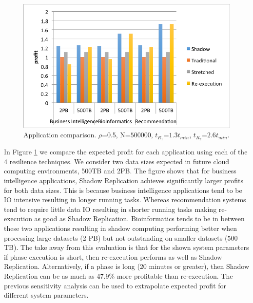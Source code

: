 \begin{figure}[!h]
	
	\begin{center}
	\includegraphics[width=\columnwidth]{diagrams/application_comparison.png}
	\end{center}
	\caption{Application comparison. $\rho$=0.5, N=$500000$, $t_{R_1}$=$1.3t_{min}$, $t_{R_2}$=$2.6t_{min}$.}
	\label{fig:app_compare}
\end{figure}


In Figure \ref{fig:app_compare} we compare the expected
profit for each application using each of the 4 resilience techniques. 
We consider two data sizes expected in future
cloud computing environments, 500TB and 2PB. The figure shows that
for business intelligence applications, Shadow Replication achieves significantly larger profits for both data sizes. This
is because business intelligence applications tend to be IO intensive
resulting in longer running tasks. Whereas recommendation systems tend
to require little data IO resulting in shorter running tasks making
re-execution as good as Shadow Replication. Bioinformatics tends to be in between
these two applications resulting in shadow computing performing better
when processing large datasets (2 PB) but not outstanding on smaller
datasets (500 TB). The take away from this evaluation is that for the
shown system parameters if phase execution is short, then re-execution
performs as well as Shadow Replication. Alternatively, if a phase is long (20 minutes or
greater), then Shadow Replication can be as much as 47.9\% more
profitable than re-execution. The previous sensitivity analysis can be
used to extrapolate expected profit for different system parameters.


